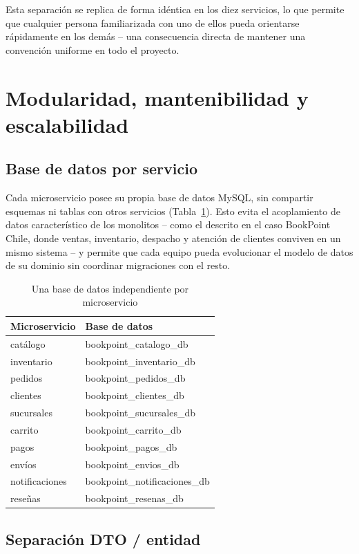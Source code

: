 Esta separación se replica de forma idéntica en los diez servicios, lo que permite que
cualquier persona familiarizada con uno de ellos pueda orientarse rápidamente en los
demás -- una consecuencia directa de mantener una convención uniforme en todo el
proyecto.

\section{Modularidad, mantenibilidad y escalabilidad}

\subsection{Base de datos por servicio}

Cada microservicio posee su propia base de datos MySQL, sin compartir esquemas ni
tablas con otros servicios (Tabla~\ref{tab:bd-servicio}). Esto evita el acoplamiento de
datos característico de los monolitos -- como el descrito en el caso BookPoint Chile,
donde ventas, inventario, despacho y atención de clientes conviven en un mismo sistema
-- y permite que cada equipo pueda evolucionar el modelo de datos de su dominio sin
coordinar migraciones con el resto.

\begin{table}[h]
\centering
\begin{tabular}{ll}
\toprule
\textbf{Microservicio} & \textbf{Base de datos} \\
\midrule
catálogo & bookpoint\_catalogo\_db \\
inventario & bookpoint\_inventario\_db \\
pedidos & bookpoint\_pedidos\_db \\
clientes & bookpoint\_clientes\_db \\
sucursales & bookpoint\_sucursales\_db \\
carrito & bookpoint\_carrito\_db \\
pagos & bookpoint\_pagos\_db \\
envíos & bookpoint\_envios\_db \\
notificaciones & bookpoint\_notificaciones\_db \\
reseñas & bookpoint\_resenas\_db \\
\bottomrule
\end{tabular}
\caption{Una base de datos independiente por microservicio}
\label{tab:bd-servicio}
\end{table}

\subsection{Separación DTO / entidad}


